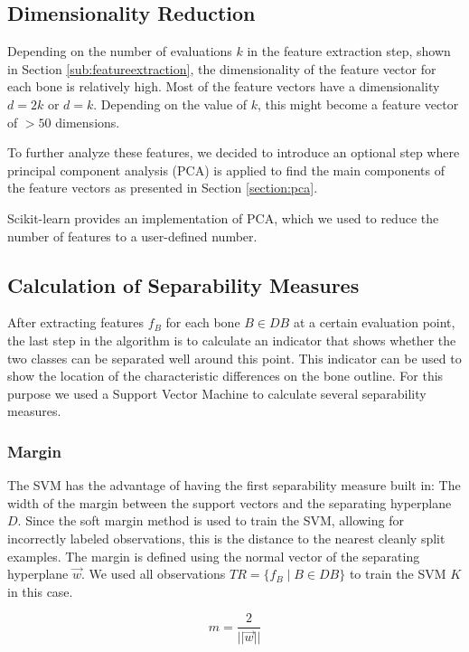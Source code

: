 \documentclass[pdftex,12pt,a4paper]{report}
\begin{document}
\subsection{Dimensionality Reduction}

Depending on the number of evaluations $k$ in the feature extraction step, shown in Section
\ref{sub:featureextraction}, the dimensionality of the feature vector for each bone is relatively high. Most of 
the feature vectors have a dimensionality $d = 2k$ or $d = k$. Depending on the value of $k$, this might become
a feature vector of $> 50$ dimensions.

To further analyze these features, we decided to introduce an optional step where principal component analysis
(PCA) is applied to find the main components of the feature vectors as presented in Section \ref{section:pca}. 

Scikit-learn \cite{pedregosa2011scikit} provides an implementation of PCA, which we used to reduce the number of features to a user-defined number.

\subsection{Calculation of Separability Measures}

After extracting features $f_B$ for each bone $B \in DB$ at a certain evaluation point, the last step in the
algorithm is to calculate an indicator that shows whether the two classes can be separated well around this point.
This indicator can be used to show the location of the characteristic differences on the bone outline. For this
purpose we used a Support Vector Machine to calculate several separability measures.

\subsubsection{Margin}

The SVM has the advantage of having the first separability measure built in: The width of the margin between the
support vectors and the separating hyperplane $D$. Since the soft margin method is used to train the SVM, allowing for incorrectly labeled observations, this is the distance to the nearest cleanly split examples. The margin is 
defined using the normal vector of the separating hyperplane $\vec{w}$. We used all observations $TR = \{ f_B \mid B \in DB \}$ to train the SVM $K$ in this case.

\begin{equation}
m = \frac{2}{||\vec{w}||}
\end{equation}
\end{document}
